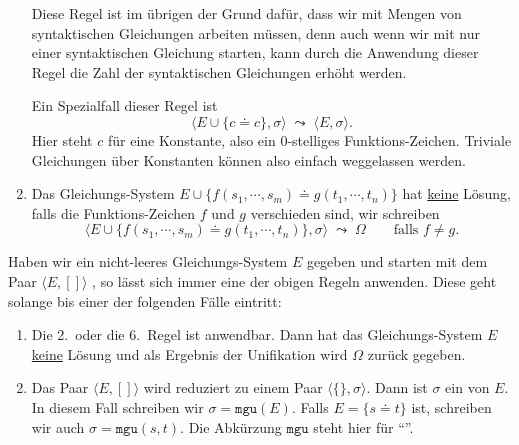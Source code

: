 \begin{enumerate}
      Diese Regel ist im übrigen der Grund dafür, dass wir mit Mengen von syntaktischen Gleichungen
      arbeiten müssen, denn auch wenn wir mit nur einer syntaktischen Gleichung starten, kann 
      durch die Anwendung dieser Regel die Zahl der syntaktischen Gleichungen erhöht werden.

      Ein Spezialfall dieser Regel ist 
      \[ \Big\langle E \cup \big\{ c \doteq c \big\}, \sigma \Big\rangle \;\leadsto\; 
         \Big\langle E, \sigma \Big\rangle.
      \]
      Hier steht $c$ für eine Konstante, also ein 0-stelliges Funktions-Zeichen. 
      Triviale Gleichungen über Konstanten können also einfach weggelassen werden.
\item Das Gleichungs-System $E \cup \big\{ f(s_1,\cdots,s_m) \doteq g(t_1,\cdots,t_n) \big\}$
      hat \underline{\color{red}keine} Lösung, falls die Funk\-tions-Zeichen $f$ und $g$ verschieden sind, wir schreiben
      \[ \Big\langle E \cup \big\{ f(s_1,\cdots,s_m) \doteq g(t_1,\cdots,t_n) \big\},
      \sigma \Big\rangle \;\leadsto\; \Omega \qquad \mbox{falls $f \not= g$}. \]
\end{enumerate}
Haben wir ein nicht-leeres Gleichungs-System $E$ gegeben und starten mit dem Paar 
$\langle E, []\rangle$  , so lässt sich immer eine der
obigen Regeln anwenden.  Diese geht solange bis einer der folgenden Fälle eintritt:
\begin{enumerate}
\item Die 2.~oder die 6.~Regel ist anwendbar.  Dann hat das Gleichungs-System $E$ 
      \underline{\color{red}keine} Lösung und als Ergebnis der Unifikation wird $\Omega$ zurück gegeben.
\item Das Paar $\langle E, [] \rangle$ wird reduziert zu einem Paar $\langle \{\}, \sigma\rangle$.
      Dann ist $\sigma$ ein  von $E$.  In diesem Fall schreiben wir $\sigma = \mathtt{mgu}(E)$.
      Falls $E = \{ s \doteq t \}$ ist, schreiben wir auch $\sigma = \mathtt{mgu}(s, t)$.  Die Abkürzung
      $\mathtt{mgu}$ steht hier für {``''}.
\end{enumerate}

